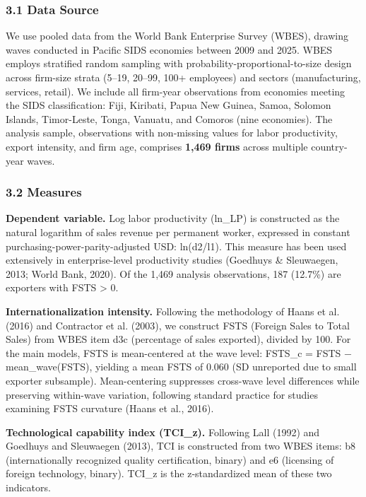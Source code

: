 \documentclass[12pt,a4paper]{article}
\begin{document}
\hypertarget{31-data-source}{%
\subsubsection{3.1 Data Source}\label{31-data-source}}

We use pooled data from the World Bank Enterprise Survey (WBES), drawing
waves conducted in Pacific SIDS economies between 2009 and 2025. WBES
employs stratified random sampling with probability-proportional-to-size
design across firm-size strata (5--19, 20--99, 100+ employees) and
sectors (manufacturing, services, retail). We include all firm-year
observations from economies meeting the SIDS classification: Fiji,
Kiribati, Papua New Guinea, Samoa, Solomon Islands, Timor-Leste, Tonga,
Vanuatu, and Comoros (nine economies). The analysis sample, observations
with non-missing values for labor productivity, export intensity, and
firm age, comprises \textbf{1,469 firms} across multiple country-year
waves.

\hypertarget{32-measures}{%
\subsubsection{3.2 Measures}\label{32-measures}}

\textbf{Dependent variable.} Log labor productivity (ln\_LP) is
constructed as the natural logarithm of sales revenue per permanent
worker, expressed in constant purchasing-power-parity-adjusted USD:
ln(d2/l1). This measure has been used extensively in enterprise-level
productivity studies (Goedhuys \& Sleuwaegen, 2013; World Bank, 2020).
Of the 1,469 analysis observations, 187 (12.7\%) are exporters with FSTS
\textgreater{} 0.

\textbf{Internationalization intensity.} Following the methodology of
Haans et al. (2016) and Contractor et al. (2003), we construct FSTS
(Foreign Sales to Total Sales) from WBES item d3c (percentage of sales
exported), divided by 100. For the main models, FSTS is mean-centered at
the wave level: FSTS\_c = FSTS − mean\_wave(FSTS), yielding a mean FSTS
of 0.060 (SD unreported due to small exporter subsample). Mean-centering
suppresses cross-wave level differences while preserving within-wave
variation, following standard practice for studies examining FSTS
curvature (Haans et al., 2016).

\textbf{Technological capability index (TCI\_z).} Following Lall (1992)
and Goedhuys and Sleuwaegen (2013), TCI is constructed from two WBES
items: b8 (internationally recognized quality certification, binary) and
e6 (licensing of foreign technology, binary). TCI\_z is the
z-standardized mean of these two indicators.
\end{document}
